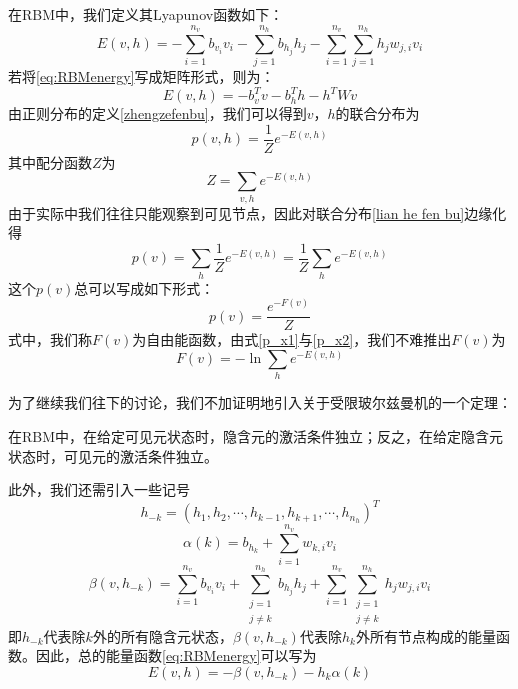 在RBM中，我们定义其Lyapunov函数如下：
\begin{equation}\label{eq:RBMenergy}
E(v, h) = - \sum\limits_{i=1}^{n_v}b_{v_i}v_i - \sum\limits_{j=1}^{n_h}b_{h_j}h_j -  \sum\limits_{i=1}^{n_v} \sum\limits_{j=1}^{n_h} h_j w_{j, i}v_i
\end{equation}
若将\eqref{eq:RBMenergy}写成矩阵形式，则为：
\begin{equation}
E(v, h) = -b_v^T v - b_h^T h - h^T W v
\end{equation}
由正则分布的定义\eqref{zhengzefenbu}，我们可以得到$v$，$h$的联合分布为
\begin{equation}\label{lian he fen bu}
p(v, h) = \frac{1}{Z} e^{-E(v, h)}
\end{equation}
其中配分函数$Z$为
\begin{equation}\label{partionFunc}
Z = \sum\limits_{v, h}e^{-E(v, h)}
\end{equation}
由于实际中我们往往只能观察到可见节点，因此对联合分布\eqref{lian he fen bu}边缘化得
\begin{equation}\label{p_x1}
p(v) = \sum\limits_h \frac{1}{Z}e^{-E(v, h)} = \frac{1}{Z}\sum\limits_h e^{-E(v, h)}
\end{equation}
这个$ p(v) $总可以写成如下形式：
\begin{equation}\label{p_x2}
p(v) = \frac{e^{-F(v)}}{Z}
\end{equation}
式中，我们称$ F(v)  $为自由能函数，由式\eqref{p_x1}与\eqref{p_x2}，我们不难推出$ F(v)  $为
\begin{equation}\label{freeEnergyDef}
F(v) = -\ln\sum\limits_h e^{-E(v, h)}
\end{equation}

为了继续我们往下的讨论，我们不加证明地引入关于受限玻尔兹曼机的一个定理：
\begin{theorem}\label{theo:iid}
在RBM中，在给定可见元状态时，隐含元的激活条件独立；反之，在给定隐含元状态时，可见元的激活条件独立。
\end{theorem}

此外，我们还需引入一些记号
\begin{equation}
h_{-k} = (h_1, h_2, \cdots, h_{k-1}, h_{k+1},\cdots, h_{n_h})^T
\end{equation}
\begin{equation}
\alpha(k) = b_{h_k} + \sum\limits_{i=1}^{n_v} w_{k, i}v_i
\end{equation}
\begin{equation}
\beta(v, h_{-k}) = \sum\limits_{i=1}^{n_v} b_{v_i}v_i + \sum_{\substack{j=1\\ j\neq k}}^{n_h} b_{h_j}h_j +  \sum\limits_{i=1}^{n_v}  \sum_{\substack{j=1\\ j\neq k}}^{n_h} h_j w_{j, i}v_i
\end{equation}
即$h_{-k}$代表除$k$外的所有隐含元状态，$\beta(v, h_{-k})$代表除$h_k$外所有节点构成的能量函数。因此，总的能量函数\eqref{eq:RBMenergy}可以写为
\begin{equation}
E(v, h) = -\beta(v, h_{-k}) - h_k \alpha(k)
\end{equation}

